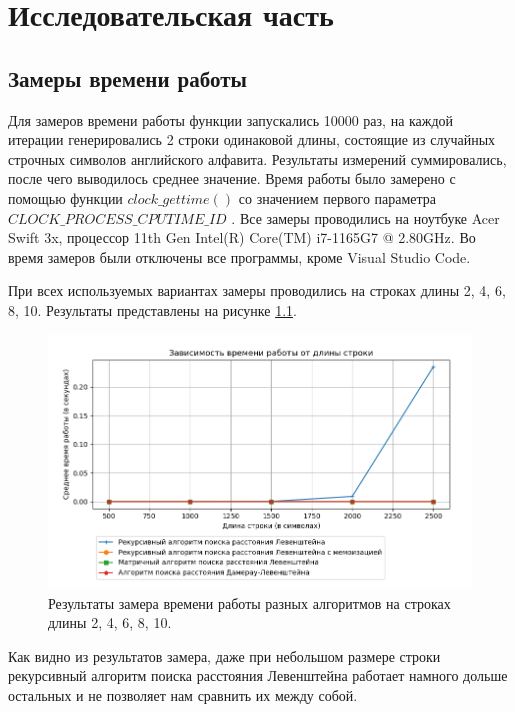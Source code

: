 \chapter{Исследовательская часть}

\section{Замеры времени работы}

Для замеров времени работы функции запускались 10000 раз, на каждой итерации генерировались 2 строки одинаковой длины, состоящие из случайных строчных символов английского алфавита. Результаты измерений суммировались, после чего выводилось среднее значение. Время работы было замерено с помощью функции $clock\_gettime()$ со значением первого параметра $CLOCK\_PROCESS\_CPUTIME\_ID$ \cite{clockgettime}. Все замеры проводились на ноутбуке Acer Swift 3x, процессор 11th Gen Intel(R) Core(TM) i7-1165G7 @ 2.80GHz. Во время замеров были отключены все программы, кроме Visual Studio Code.

При всех используемых вариантах замеры проводились на строках длины 2, 4, 6, 8, 10. Результаты представлены на рисунке \ref{fig:res1}.

\begin{figure}[h!]
	\centering
	\includegraphics[width=1\textwidth]{tex_parts/research1.png}
	\caption{\label{fig:res1} Результаты замера времени работы разных алгоритмов на строках длины 2, 4, 6, 8, 10.}
\end{figure}

Как видно из результатов замера, даже при небольшом размере строки рекурсивный алгоритм поиска расстояния Левенштейна работает намного дольше остальных и не позволяет нам сравнить их между собой.


